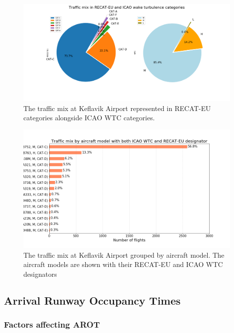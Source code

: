 \begin{figure}[ht]
    \centering
    \includegraphics[width=1\textwidth]{graphics/fig_post_fast_exit_mix_pie_v2.png}
    \caption[Traffic mix in RECAT-EU and ICAO WTC]{The traffic mix at Keflavik Airport represented in RECAT-EU categories alongside ICAO WTC categories.}
    \label{fig:post_fast_exit_mix_pie_v2}
\end{figure}


\begin{figure}
    \centering
    \includegraphics[width=1\textwidth]{graphics/fig_traffic_mix_by_model.png}
    \caption[Traffic mix by aircraft model.]{The traffic mix at Keflavik Airport grouped by aircraft model. The aircraft models are shown with their RECAT-EU and ICAO WTC designators}
    \label{fig:traffic_mix_by_model}
\end{figure}

\subsection{Arrival Runway Occupancy Times}

\subsubsection{Factors affecting AROT\label{sssec:factors_arot}}


